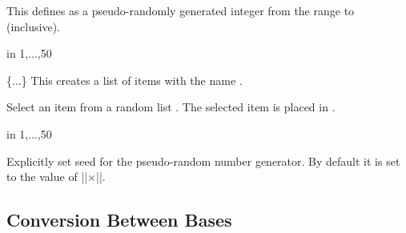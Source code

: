 \begin{command}{\pgfmathrandominteger{}}
	This defines  as a pseudo-randomly generated integer from 
	the range  to  (inclusive).
	
\begin{codeexample}[]
\begin{pgfpicture}
   \foreach \x in {1,...,50}{
      \color{blue!40!white}
   }	  
\end{pgfpicture}
\end{codeexample}
\end{command}

\begin{command}{\pgfmathdeclarerandomlist{}\{...\}}
	This creates a list of items with the name .
\end{command}

\begin{command}{\pgfmathrandomitem{}}
	Select an item from a random list . The
	selected item is placed in .
\end{command}

\begin{codeexample}[]
\begin{pgfpicture}
   \foreach \a in {1,...,50}{
      \color{\c!40!white}
   }	  
\end{pgfpicture}
\end{codeexample}

\begin{command}{\pgfmathsetseed{}}
  Explicitly set seed for the pseudo-random number generator. By
  default it is set to the value of |\time|$\times$|\year|.
\end{command}


      
\subsection{Conversion Between Bases}
	

